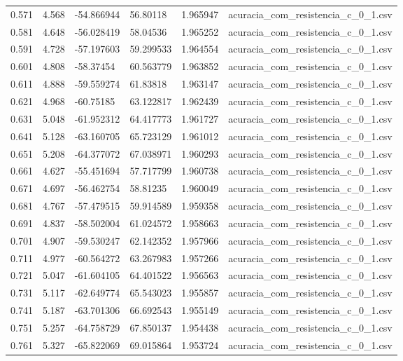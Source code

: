 \begin{table}
\begin{tabular}{llllll}
0.571 & 4.568 & -54.866944 & 56.80118 & 1.965947 & acuracia\_com\_resistencia\_c\_0\_1.csv \\
0.581 & 4.648 & -56.028419 & 58.04536 & 1.965252 & acuracia\_com\_resistencia\_c\_0\_1.csv \\
0.591 & 4.728 & -57.197603 & 59.299533 & 1.964554 & acuracia\_com\_resistencia\_c\_0\_1.csv \\
0.601 & 4.808 & -58.37454 & 60.563779 & 1.963852 & acuracia\_com\_resistencia\_c\_0\_1.csv \\
0.611 & 4.888 & -59.559274 & 61.83818 & 1.963147 & acuracia\_com\_resistencia\_c\_0\_1.csv \\
0.621 & 4.968 & -60.75185 & 63.122817 & 1.962439 & acuracia\_com\_resistencia\_c\_0\_1.csv \\
0.631 & 5.048 & -61.952312 & 64.417773 & 1.961727 & acuracia\_com\_resistencia\_c\_0\_1.csv \\
0.641 & 5.128 & -63.160705 & 65.723129 & 1.961012 & acuracia\_com\_resistencia\_c\_0\_1.csv \\
0.651 & 5.208 & -64.377072 & 67.038971 & 1.960293 & acuracia\_com\_resistencia\_c\_0\_1.csv \\
0.661 & 4.627 & -55.451694 & 57.717799 & 1.960738 & acuracia\_com\_resistencia\_c\_0\_1.csv \\
0.671 & 4.697 & -56.462754 & 58.81235 & 1.960049 & acuracia\_com\_resistencia\_c\_0\_1.csv \\
0.681 & 4.767 & -57.479515 & 59.914589 & 1.959358 & acuracia\_com\_resistencia\_c\_0\_1.csv \\
0.691 & 4.837 & -58.502004 & 61.024572 & 1.958663 & acuracia\_com\_resistencia\_c\_0\_1.csv \\
0.701 & 4.907 & -59.530247 & 62.142352 & 1.957966 & acuracia\_com\_resistencia\_c\_0\_1.csv \\
0.711 & 4.977 & -60.564272 & 63.267983 & 1.957266 & acuracia\_com\_resistencia\_c\_0\_1.csv \\
0.721 & 5.047 & -61.604105 & 64.401522 & 1.956563 & acuracia\_com\_resistencia\_c\_0\_1.csv \\
0.731 & 5.117 & -62.649774 & 65.543023 & 1.955857 & acuracia\_com\_resistencia\_c\_0\_1.csv \\
0.741 & 5.187 & -63.701306 & 66.692543 & 1.955149 & acuracia\_com\_resistencia\_c\_0\_1.csv \\
0.751 & 5.257 & -64.758729 & 67.850137 & 1.954438 & acuracia\_com\_resistencia\_c\_0\_1.csv \\
0.761 & 5.327 & -65.822069 & 69.015864 & 1.953724 & acuracia\_com\_resistencia\_c\_0\_1.csv \\

\end{tabular}
\end{table}
